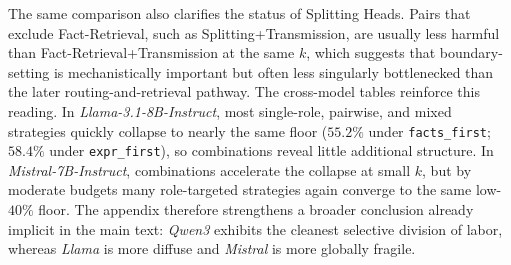 \documentclass[11pt]{article}
\begin{document}
The same comparison also clarifies the status of Splitting Heads. Pairs that exclude Fact-Retrieval, such as Splitting+Transmission, are usually less harmful than Fact-Retrieval+Transmission at the same $k$, which suggests that boundary-setting is mechanistically important but often less singularly bottlenecked than the later routing-and-retrieval pathway. The cross-model tables reinforce this reading. In \textit{Llama-3.1-8B-Instruct}, most single-role, pairwise, and mixed strategies quickly collapse to nearly the same floor ($55.2\%$ under \texttt{facts\_first}; $58.4\%$ under \texttt{expr\_first}), so combinations reveal little additional structure. In \textit{Mistral-7B-Instruct}, combinations accelerate the collapse at small $k$, but by moderate budgets many role-targeted strategies again converge to the same low-$40\%$ floor. The appendix therefore strengthens a broader conclusion already implicit in the main text: \textit{Qwen3} exhibits the cleanest selective division of labor, whereas \textit{Llama} is more diffuse and \textit{Mistral} is more globally fragile.
\end{document}
